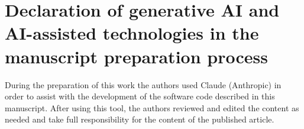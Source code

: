 \section*{Declaration of generative AI and AI-assisted technologies in the manuscript preparation process}

During the preparation of this work the authors used Claude (Anthropic) in order
to assist with the development of the software code described in this manuscript.
After using this tool, the authors reviewed and edited the content as needed and
take full responsibility for the content of the published article.


